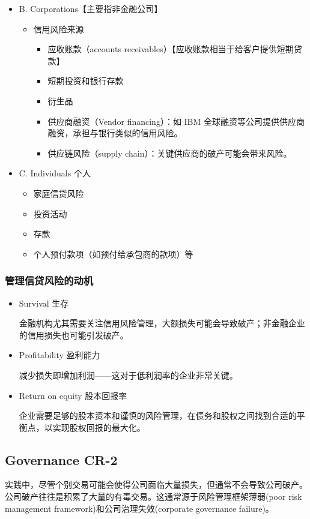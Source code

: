 \begin{itemize}
\item B. Corporations【主要指非金融公司】
    \begin{itemize}
    \item 信用风险来源
        \begin{itemize}
        \item 应收账款（accounts receivables）【应收账款相当于给客户提供短期贷款】
        \item 短期投资和银行存款
        \item 衍生品
        \item 供应商融资（Vendor financing）：如 IBM 全球融资等公司提供供应商融资，承担与银行类似的信用风险。
        \item 供应链风险（supply chain）：关键供应商的破产可能会带来风险。
        \end{itemize}
    \end{itemize}

\item C. Individuals 个人
    \begin{itemize}
    \item 家庭信贷风险
    \item 投资活动
    \item 存款
    \item 个人预付款项（如预付给承包商的款项）等
    \end{itemize}
\end{itemize}


\subsubsection{管理信贷风险的动机}




\begin{itemize}
\item Survival 生存

金融机构尤其需要关注信用风险管理，大额损失可能会导致破产；非金融企业的信用损失也可能引发破产。

\item Profitability 盈利能力

减少损失即增加利润——这对于低利润率的企业非常关键。

\item Return on equity 股本回报率

企业需要足够的股本资本和谨慎的风险管理，在债务和股权之间找到合适的平衡点，以实现股权回报的最大化。
\end{itemize}


\subsection{Governance CR-2}
实践中，尽管个别交易可能会使得公司面临大量损失，但通常不会导致公司破产。公司破产往往是积累了大量的有毒交易。这通常源于风险管理框架薄弱(poor risk management framework)和公司治理失效(corporate governance failure)。


